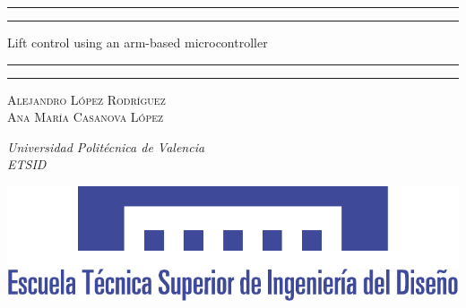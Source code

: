 \begin{titlepage} %

    \selectfont
	\centering %
	\scshape %
	\vspace*{\baselineskip} %
	

	\vspace{5\baselineskip}
	
	\rule{\textwidth}{1.6pt}\vspace*{-\baselineskip}\vspace*{2pt} %
	\rule{\textwidth}{0.4pt} %
	
	\vspace{0.75\baselineskip} %
	
	{\LARGE Lift control using an arm-based microcontroller\\} %
	
	\vspace{0.75\baselineskip} %
	
	\rule{\textwidth}{0.4pt}\vspace*{-\baselineskip}\vspace{3.2pt} %
	\rule{\textwidth}{1.6pt} %
	
	\vspace{1.5\baselineskip} %


	
	{\scshape\Large Alejandro López Rodríguez \\
	                Ana María Casanova López
	
	} %
	
	\vspace{1.5\baselineskip} %
	
	\textit{Universidad Politécnica de Valencia\\ ETSID\\} 
	
	\vspace{2\baselineskip} %
	\thedate
	

	
	\vfill %
	\includegraphics[scale = 0.5]{Graphics/LOGO_ETSID.pdf}

\end{titlepage}